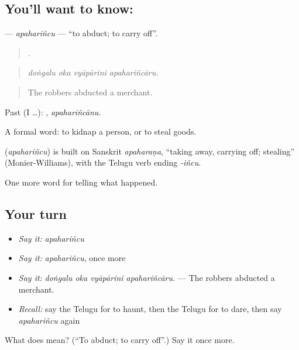 \subsection*{You'll want to know: }
\textbf{} — \emph{apahariñcu} — \textquotedblleft{}to abduct; to carry off\textquotedblright{}.

\begin{quote}
   .
\end{quote}

\begin{quote}
\emph{doṅgalu oka vyāpārini apahariñcāru.}
\end{quote}

\begin{quote}
The robbers abducted a merchant.
\end{quote}

Past (I …): , \emph{apahariñcānu}.

A formal word: to kidnap a person, or to steal goods.

\begin{cousinweb}
\textbf{} (\emph{apahariñcu}) is built on Sanskrit \emph{apaharaṇa}, \textquotedblleft{}taking away, carrying off; stealing\textquotedblright{} (Monier-Williams), with the Telugu verb ending \emph{-iñcu}.
\end{cousinweb}

\begin{grammarlens}[title={What you've built}]
One more word for telling what happened.
\end{grammarlens}

\subsection*{Your turn}
\begin{itemize}
\raggedright
  \item \emph{Say it:} \emph{apahariñcu}
  \item \emph{Say it:} \emph{apahariñcu}, once more
  \item \emph{Say it:} \emph{doṅgalu oka vyāpārini apahariñcāru.} — The robbers abducted a merchant.
  \item \emph{Recall:} say the Telugu for to haunt, then the Telugu for to dare, then say \emph{apahariñcu} again
\end{itemize}

\begin{tcolorbox}[breakable,colback=teal!4,colframe=teal!35!black,title={Before you move on}]
What does  mean? (\textquotedblleft{}To abduct; to carry off\textquotedblright{}.) Say it once more.
\end{tcolorbox}
